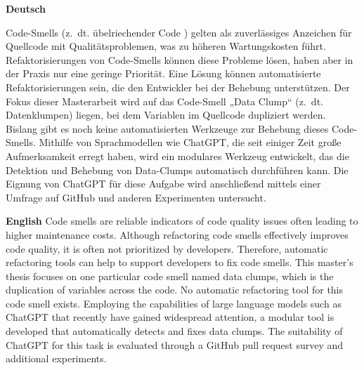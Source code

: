 \textbf{Deutsch}

Code-Smells (z.~dt. übelriechender Code ) gelten als zuverlässiges Anzeichen für Quellcode mit Qualitätsproblemen, was zu höheren Wartungskosten führt. Refaktorisierungen von Code-Smells können diese Probleme lösen, haben aber in der Praxis nur eine geringe Priorität. Eine Lösung können automatisierte Refaktorisierungen sein, die den Entwickler bei der Behebung unterstützen. Der Fokus dieser Masterarbeit wird auf das Code-Smell „Data Clump“ (z.~dt. Datenklumpen) liegen, bei dem Variablen im Quellcode dupliziert werden. Bislang gibt es noch keine automatisierten Werkzeuge zur Behebung dieses Code-Smells. Mithilfe von Sprachmodellen wie ChatGPT, die  seit einiger Zeit große Aufmerksamkeit erregt haben,  wird ein modulares Werkzeug entwickelt, das die Detektion und Behebung von Data-Clumps automatisch durchführen kann.  Die Eignung von ChatGPT für diese Aufgabe wird  anschließend mittels einer Umfrage auf GitHub und anderen Experimenten untersucht. 
\bigskip

\noindent
\textbf{English} 
Code smells are reliable indicators of code quality issues  often leading to higher maintenance costs. Although refactoring code smells effectively improves code quality, it is often not prioritized by developers.  Therefore, automatic refactoring tools can help to support developers to fix code smells. This master's thesis focuses on one particular code  smell named data clumps, which is the duplication of variables across the code. No automatic refactoring tool for this code smell exists. Employing the capabilities of large language models such as ChatGPT that  recently have gained widespread attention, a modular tool is developed  that automatically detects and fixes data clumps. The suitability of ChatGPT for this task is evaluated through a GitHub pull request survey and additional experiments.

